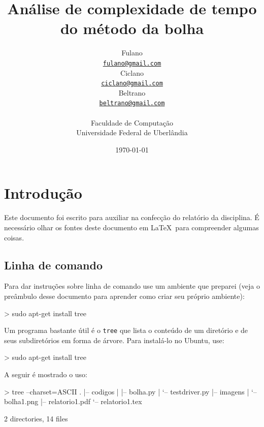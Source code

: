 \documentclass[12pt,a4paper,twoside]{report}
\title{Análise de complexidade de tempo do método da bolha}
\date{}
\author{Fulano \\
\texttt{\small \url{fulano@gmail.com}}\\
Ciclano \\
\texttt{\small \url{ciclano@gmail.com}}\\
Beltrano \\
\texttt{\small \url{beltrano@gmail.com}}\\
\vspace{1cm} \\
Faculdade de Computação \\
Universidade Federal de Uberlândia
}
\date{\today}
\begin{document}
  \maketitle
\listoffigures            
\listoftables            
\lstlistoflistings

\tableofcontents    


\fancyhead[RE,LO]{\thesection}

\setlength{\parskip}{0.15in} %

\chapter{Introdução}
Este documento foi escrito para auxiliar na confecção do relatório da
disciplina. É necessário olhar os fontes deste documento em \LaTeX\ para
compreender algumas coisas.

\section{Linha de comando}
Para dar instruções sobre linha de comando use um ambiente que preparei
(veja o preâmbulo desse documento para aprender como criar seu próprio
ambiente):

\begin{latex}
\begin{terminal}
> sudo apt-get install tree
\end{terminal}
\end{latex}

Um programa bastante útil é o \verb|tree| que lista o conteúdo de um
diretório e de seus subdiretórios em forma de árvore. Para instalá-lo no
Ubuntu, use:

\begin{terminal}
> sudo apt-get install tree
\end{terminal}

A seguir é mostrado o uso:
\begin{terminal}
> tree --charset=ASCII
.
|-- codigos
|   |-- bolha.py
|   `-- testdriver.py
|-- imagens
|   `-- bolha1.png
|-- relatorio1.pdf
`-- relatorio1.tex

2 directories, 14 files
\end{terminal}
\end{document}
